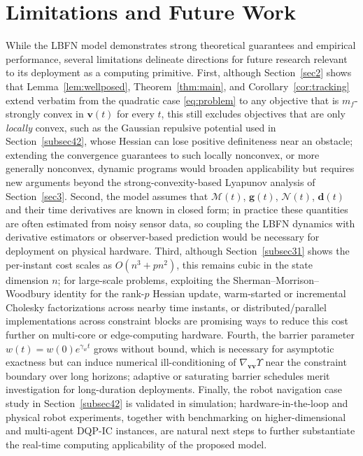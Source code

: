 \documentclass[pdflatex,sn-mathphys,Numbered]{sn-jnl}
\theoremstyle{thmstyleone}
\theoremstyle{thmstyletwo}
\theoremstyle{thmstylethree}
\begin{document}
\section{Limitations and Future Work}\label{sec5}
While the LBFN model demonstrates strong theoretical guarantees and empirical performance, several limitations delineate directions for future research relevant to its deployment as a computing primitive. First, although Section~\ref{sec2} shows that Lemma~\ref{lem:wellposed}, Theorem~\ref{thm:main}, and Corollary~\ref{cor:tracking} extend verbatim from the quadratic case \eqref{eq:problem} to any objective that is $m_f$-strongly convex in $\bm{v}(t)$ for every $t$, this still excludes objectives that are only \emph{locally} convex, such as the Gaussian repulsive potential used in Section~\ref{subsec42}, whose Hessian can lose positive definiteness near an obstacle; extending the convergence guarantees to such locally nonconvex, or more generally nonconvex, dynamic programs would broaden applicability but requires new arguments beyond the strong-convexity-based Lyapunov analysis of Section~\ref{sec3}. Second, the model assumes that $\mathcal{M}(t)$, $\bm{g}(t)$, $\mathcal{N}(t)$, $\bm{d}(t)$ and their time derivatives are known in closed form; in practice these quantities are often estimated from noisy sensor data, so coupling the LBFN dynamics with derivative estimators or observer-based prediction would be necessary for deployment on physical hardware. Third, although Section~\ref{subsec31} shows the per-instant cost scales as $O(n^3+pn^2)$, this remains cubic in the state dimension $n$; for large-scale problems, exploiting the Sherman--Morrison--Woodbury identity for the rank-$p$ Hessian update, warm-started or incremental Cholesky factorizations across nearby time instants, or distributed/parallel implementations across constraint blocks are promising ways to reduce this cost further on multi-core or edge-computing hardware. Fourth, the barrier parameter $w(t)=w(0)e^{\gamma_w t}$ grows without bound, which is necessary for asymptotic exactness but can induce numerical ill-conditioning of $\nabla_{\bm{vv}}\Upsilon$ near the constraint boundary over long horizons; adaptive or saturating barrier schedules merit investigation for long-duration deployments. Finally, the robot navigation case study in Section~\ref{subsec42} is validated in simulation; hardware-in-the-loop and physical robot experiments, together with benchmarking on higher-dimensional and multi-agent DQP-IC instances, are natural next steps to further substantiate the real-time computing applicability of the proposed model.
\end{document}
